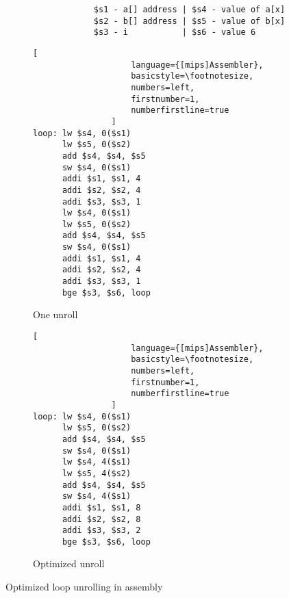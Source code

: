 \ifrelease
\begin{figure}[h]
    \centering
    \begin{adjustbox}{minipage=\linewidth,scale=0.8}
        \centering
        \begin{verbatim}
                  $s1 - a[] address | $s4 - value of a[x]
                  $s2 - b[] address | $s5 - value of b[x]
                  $s3 - i           | $s6 - value 6
        \end{verbatim}
        \begin{subfigure}{.55\textwidth}
            \centering
            \begin{lstlisting}[
                    language={[mips]Assembler},
                    basicstyle=\footnotesize,
                    numbers=left,
                    firstnumber=1,
                    numberfirstline=true
                ]
loop: lw $s4, 0($s1)
      lw $s5, 0($s2)
      add $s4, $s4, $s5
      sw $s4, 0($s1)
      addi $s1, $s1, 4
      addi $s2, $s2, 4
      addi $s3, $s3, 1
      lw $s4, 0($s1)
      lw $s5, 0($s2)
      add $s4, $s4, $s5
      sw $s4, 0($s1)
      addi $s1, $s1, 4
      addi $s2, $s2, 4
      addi $s3, $s3, 1
      bge $s3, $s6, loop
                \end{lstlisting}
            \caption{One unroll}
            \label{fig:optimized:sub1}
        \end{subfigure}%
        \begin{subfigure}{.3\textwidth}
            \centering
            \begin{lstlisting}[
                    language={[mips]Assembler},
                    basicstyle=\footnotesize,
                    numbers=left,
                    firstnumber=1,
                    numberfirstline=true
                ]
loop: lw $s4, 0($s1)
      lw $s5, 0($s2)
      add $s4, $s4, $s5
      sw $s4, 0($s1)
      lw $s4, 4($s1)
      lw $s5, 4($s2)
      add $s4, $s4, $s5
      sw $s4, 4($s1)
      addi $s1, $s1, 8
      addi $s2, $s2, 8
      addi $s3, $s3, 2
      bge $s3, $s6, loop
                \end{lstlisting}
            \caption{Optimized unroll}
            \label{fig:optimized:sub2}
        \end{subfigure}
    \end{adjustbox}
    \caption{Optimized loop unrolling in assembly}
    \label{fig:assembly:optimized}
\end{figure}
\fi


